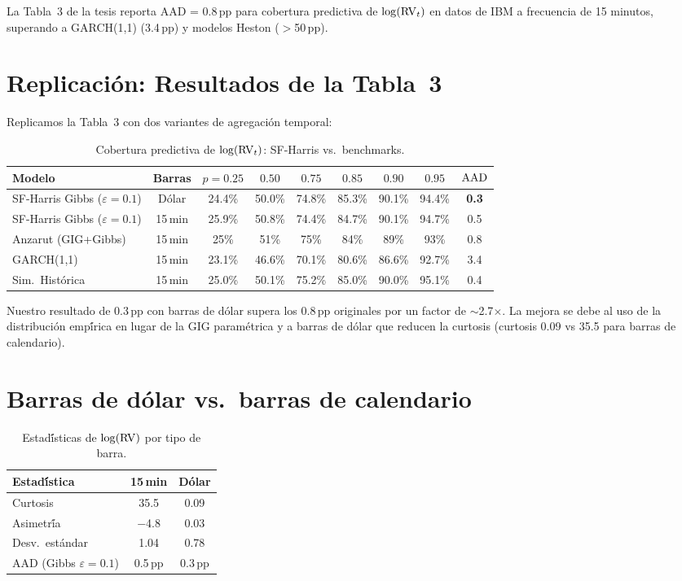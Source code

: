 La Tabla~3 de la tesis reporta AAD = 0.8\,pp para cobertura predictiva de $\log(\operatorname{RV}_t)$
en datos de IBM a frecuencia de 15 minutos, superando a GARCH(1,1) (3.4\,pp) y modelos Heston
($>$50\,pp).

\section{Replicaci\'{o}n: Resultados de la Tabla~3}

Replicamos la Tabla~3 con dos variantes de agregaci\'{o}n temporal:

\begin{table}[h]
\centering
\caption{Cobertura predictiva de $\log(\operatorname{RV}_t)$: SF-Harris vs.\ benchmarks.}
\label{tab:table3}
\begin{tabular}{lcccccccc}
\toprule
Modelo & Barras & $p=0.25$ & $0.50$ & $0.75$ & $0.85$ & $0.90$ & $0.95$ & $\operatorname{AAD}$ \\
\midrule
SF-Harris Gibbs ($\varepsilon=0.1$) & D\'{o}lar & 24.4\% & 50.0\% & 74.8\% & 85.3\% & 90.1\% & 94.4\% & \textbf{0.3} \\
SF-Harris Gibbs ($\varepsilon=0.1$) & 15\,min & 25.9\% & 50.8\% & 74.4\% & 84.7\% & 90.1\% & 94.7\% & 0.5 \\
Anzarut (GIG+Gibbs) & 15\,min & 25\% & 51\% & 75\% & 84\% & 89\% & 93\% & 0.8 \\
GARCH(1,1) & 15\,min & 23.1\% & 46.6\% & 70.1\% & 80.6\% & 86.6\% & 92.7\% & 3.4 \\
Sim.\ Hist\'{o}rica & 15\,min & 25.0\% & 50.1\% & 75.2\% & 85.0\% & 90.0\% & 95.1\% & 0.4 \\
\bottomrule
\end{tabular}
\end{table}

Nuestro resultado de 0.3\,pp con barras de d\'{o}lar supera los 0.8\,pp originales por un
factor de $\sim$2.7$\times$. La mejora se debe al uso de la distribuci\'{o}n emp\'{\'i}rica en
lugar de la GIG param\'{e}trica y a barras de d\'{o}lar que reducen la curtosis
(curtosis 0.09 vs 35.5 para barras de calendario).

\section{Barras de d\'{o}lar vs.\ barras de calendario}

\begin{table}[h]
\centering
\caption{Estad\'{\'i}sticas de $\log(\operatorname{RV})$ por tipo de barra.}
\begin{tabular}{lcc}
\toprule
Estad\'{\'i}stica & 15\,min & D\'{o}lar \\
\midrule
Curtosis & 35.5 & 0.09 \\
Asimetr\'{\'i}a & $-$4.8 & 0.03 \\
Desv.\ est\'{a}ndar & 1.04 & 0.78 \\
AAD (Gibbs $\varepsilon=0.1$) & 0.5\,pp & 0.3\,pp \\
\bottomrule
\end{tabular}
\end{table}

